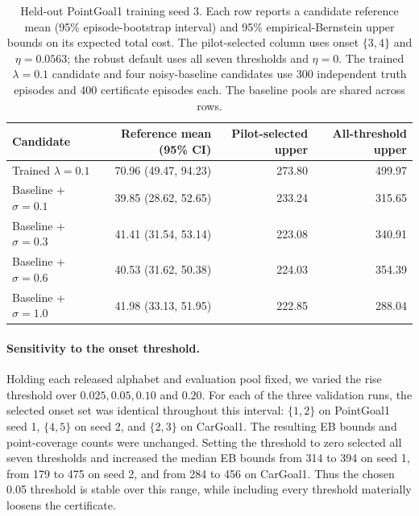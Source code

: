 \documentclass{article}
\begin{document}
\begin{table}[ht]
\centering
\caption{Held-out PointGoal1 training seed 3. Each row reports a candidate reference mean (95\% episode-bootstrap interval) and 95\% empirical-Bernstein upper bounds on its expected total cost. The pilot-selected column uses onset $\{3,4\}$ and $\eta=0.0563$; the robust default uses all seven thresholds and $\eta=0$. The trained $\lambda=0.1$ candidate and four noisy-baseline candidates use 300 independent truth episodes and 400 certificate episodes each. The baseline pools are shared across rows.}
\label{tab:seed3_noisy}
\small
\begin{tabular}{lrrr}
\toprule
Candidate & Reference mean (95\% CI) & Pilot-selected upper & All-threshold upper \\
\midrule
Trained $\lambda=0.1$ & 70.96 (49.47, 94.23) & 273.80 & 499.97 \\
Baseline + $\sigma=0.1$ & 39.85 (28.62, 52.65) & 233.24 & 315.65 \\
Baseline + $\sigma=0.3$ & 41.41 (31.54, 53.14) & 223.08 & 340.91 \\
Baseline + $\sigma=0.6$ & 40.53 (31.62, 50.38) & 224.03 & 354.39 \\
Baseline + $\sigma=1.0$ & 41.98 (33.13, 51.95) & 222.85 & 288.04 \\
\bottomrule
\end{tabular}
\end{table}

\paragraph{Sensitivity to the onset threshold.} Holding each released alphabet and evaluation pool fixed, we varied the rise threshold over $0.025,0.05,0.10$ and $0.20$. For each of the three validation runs, the selected onset set was identical throughout this interval: $\{1,2\}$ on PointGoal1 seed 1, $\{4,5\}$ on seed 2, and $\{2,3\}$ on CarGoal1. The resulting EB bounds and point-coverage counts were unchanged. Setting the threshold to zero selected all seven thresholds and increased the median EB bounds from 314 to 394 on seed 1, from 179 to 475 on seed 2, and from 284 to 456 on CarGoal1. Thus the chosen 0.05 threshold is stable over this range, while including every threshold materially loosens the certificate.
\end{document}
